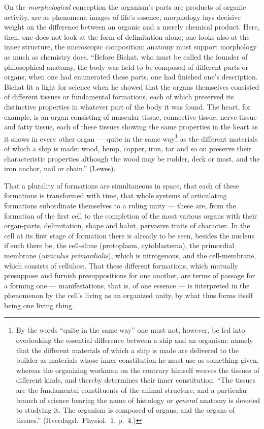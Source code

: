 \documentclass[12pt,a4paper]{book}
\begin{document}
On the \emph{morphological} conception the organism's parts are products of
organic activity, are as phenomena images of life's essence; morphology lays
decisive weight on the difference between an organic and a merely chemical
product. Here, then, one does not look at the form of delimitation alone; one
looks also at the inner structure, the microscopic composition: anatomy must
support morphology as much as chemistry does. ``Before Bichat, who must be
called the founder of philosophical anatomy, the body was held to be composed
of different parts or organs; when one had enumerated these parts, one had
finished one's description. Bichat lit a light for science when he showed that
the organs themselves consisted of different tissues or fundamental formations,
\setcounter{footnote}{0}
each of which preserved its distinctive properties in whatever part of the body
it was found. The heart, for example, is an organ consisting of muscular
tissue, connective tissue, nerve tissue and fatty tissue, each of these tissues
showing the same properties in the heart as it shows in every other organ ---
quite in the same
way\footnote{By the words ``quite in the same way'' one must not, however, be
led into overlooking the essential difference between a ship and an organism:
namely that the different materials of which a ship is made are delivered to
the builder as materials whose inner constitution he must use as something
given, whereas the organizing workman on the contrary himself weaves the
tissues of different kinds, and thereby determines their inner constitution.
``The tissues are the fundamental constituents of the animal structure, and a
particular branch of science bearing the name of histology or \emph{general}
anatomy is devoted to studying it. The organism is composed of organs, and the
organs of tissues.'' (Hverdagsl.\ Physiol.\ 1. p.~4.)}
as the different materials of which a ship is made: wood, hemp, copper, iron,
tar and so on preserve their characteristic properties although the wood may be
rudder, deck or mast, and the iron anchor, nail or chain.'' (Lewes).

That a plurality of formations are simultaneous in space, that each of these
formations is transformed with time, that whole systems of articulating
formations subordinate themselves to a ruling unity --- these are, from the
formation of the first cell to the completion of the most various organs with
their organ-parts, delimitation, shape and habit, pervasive traits of
character. In the cell at its first stage of formation there is already to be
seen, besides the nucleus if such there be, the cell-slime (protoplasm,
cytoblastema), the primordial membrane (\textit{utriculus primordialis}), which
is nitrogenous, and the cell-membrane, which consists of cellulose. That these
different formations, which mutually presuppose and furnish presuppositions for
one another, are terms of passage for a forming
\setcounter{footnote}{0}
one --- manifestations, that is, of one essence --- is interpreted in the
phenomenon by the cell's living as an organized unity, by what thus forms
itself being one living thing.
\end{document}
